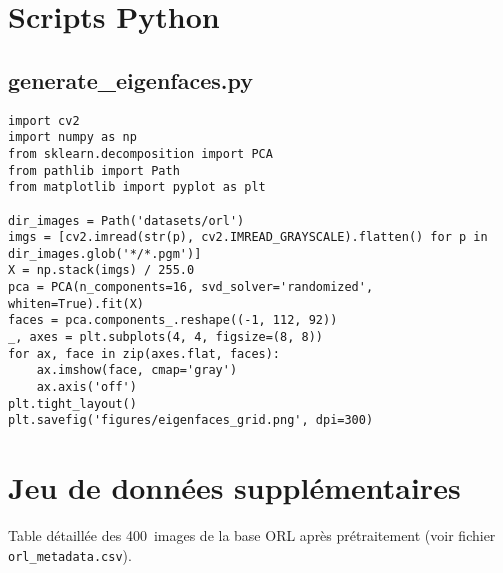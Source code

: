 \documentclass[12pt,a4paper]{report}
\begin{document}
\chapter{Scripts Python}
\section*{generate\_eigenfaces.py}
\begin{verbatim}
import cv2
import numpy as np
from sklearn.decomposition import PCA
from pathlib import Path
from matplotlib import pyplot as plt

dir_images = Path('datasets/orl')
imgs = [cv2.imread(str(p), cv2.IMREAD_GRAYSCALE).flatten() for p in dir_images.glob('*/*.pgm')]
X = np.stack(imgs) / 255.0
pca = PCA(n_components=16, svd_solver='randomized', whiten=True).fit(X)
faces = pca.components_.reshape((-1, 112, 92))
_, axes = plt.subplots(4, 4, figsize=(8, 8))
for ax, face in zip(axes.flat, faces):
    ax.imshow(face, cmap='gray')
    ax.axis('off')
plt.tight_layout()
plt.savefig('figures/eigenfaces_grid.png', dpi=300)
\end{verbatim}

\chapter{Jeu de données supplémentaires}
Table détaillée des 400 images de la base ORL après prétraitement (voir fichier \texttt{orl\_metadata.csv}).
\end{document}
